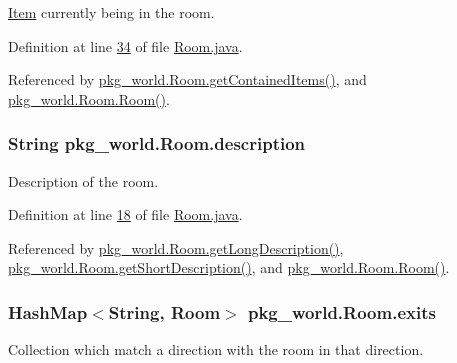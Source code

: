 \hyperlink{classpkg__world_1_1Item}{Item} currently being in the room. 



Definition at line \hyperlink{Room_8java_source_l00034}{34} of file \hyperlink{Room_8java_source}{Room.\-java}.



Referenced by \hyperlink{Room_8java_source_l00071}{pkg\-\_\-world.\-Room.\-get\-Contained\-Items()}, and \hyperlink{Room_8java_source_l00051}{pkg\-\_\-world.\-Room.\-Room()}.

\hypertarget{classpkg__world_1_1Room_a029ab15b9217139d350f3a6980e49a93}{
\subsubsection[{description}]{\setlength{\rightskip}{0pt plus 5cm}String pkg\-\_\-world.\-Room.\-description\hspace{0.3cm}{\ttfamily [private]}}}\label{classpkg__world_1_1Room_a029ab15b9217139d350f3a6980e49a93}


Description of the room. 



Definition at line \hyperlink{Room_8java_source_l00018}{18} of file \hyperlink{Room_8java_source}{Room.\-java}.



Referenced by \hyperlink{Room_8java_source_l00120}{pkg\-\_\-world.\-Room.\-get\-Long\-Description()}, \hyperlink{Room_8java_source_l00111}{pkg\-\_\-world.\-Room.\-get\-Short\-Description()}, and \hyperlink{Room_8java_source_l00041}{pkg\-\_\-world.\-Room.\-Room()}.

\hypertarget{classpkg__world_1_1Room_a7ddc883b0f176f4e8a866dfb4af66167}{
\subsubsection[{exits}]{\setlength{\rightskip}{0pt plus 5cm}Hash\-Map$<$String, {\bf Room}$>$ pkg\-\_\-world.\-Room.\-exits\hspace{0.3cm}{\ttfamily [private]}}}\label{classpkg__world_1_1Room_a7ddc883b0f176f4e8a866dfb4af66167}


Collection which match a direction with the room in that direction. 



